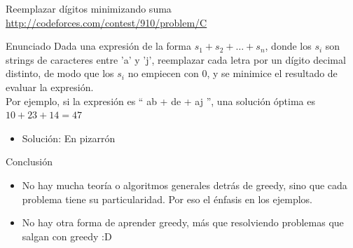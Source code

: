\documentclass{beamer}
\begin{document}
\begin{frame}{Reemplazar d\'igitos minimizando suma}
\url{http://codeforces.com/contest/910/problem/C}
\begin{block}{Enunciado}
Dada una expresi\'on de la forma $s_1 + s_2 + \dots + s_n$, donde los $s_i$ son strings de caracteres entre 'a' y 'j', reemplazar cada letra por un d\'igito decimal distinto, de modo que los $s_i$ no empiecen con $0$, y se minimice el resultado de evaluar la expresi\'on. \\
Por ejemplo, si la expresi\'on es `` ab + de + aj '', una soluci\'on \'optima es $10 + 23 + 14 = 47$
\end{block}
\begin{itemize}
\item
Soluci\'on: En pizarr\'on
\end{itemize}
\end{frame}

\begin{frame}{Conclusi\'on}
\begin{itemize}
\item
No hay mucha teor\'ia o algoritmos generales detr\'as de greedy, sino que cada problema tiene su particularidad. Por eso el \'enfasis en los ejemplos.
\item
No hay otra forma de aprender greedy, m\'as que resolviendo problemas que salgan con greedy :D

\end{itemize}
\end{frame}
\end{document}
